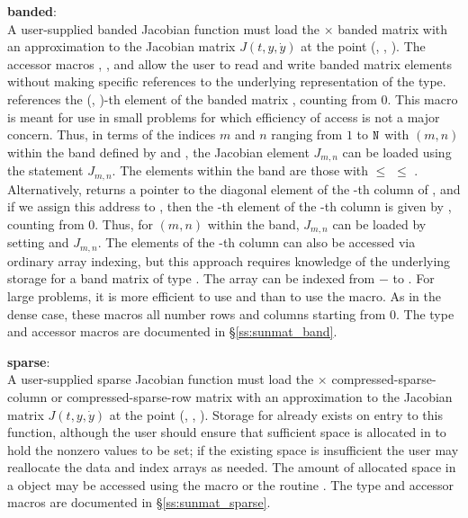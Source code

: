 {{  {\bf banded}:\\
  A user-supplied banded Jacobian function must load the  $\times$ 
  banded matrix  with an approximation to the Jacobian matrix $J(t,y,\dot{y})$
  at the point (, , ).
  The accessor macros ,
  , and  allow the user
  to read and write banded matrix elements without making specific
  references to the underlying representation of the {\sunmatband}
  type.   references the (,
  )-th element of the banded matrix , counting from $0$.
  This macro is meant for use in small problems for which efficiency
  of access is not a major concern.  Thus, in terms of the indices $m$
  and $n$ ranging from $1$ to ${\tt N}$ with $(m,n)$ within the band defined
  by  and , the Jacobian element $J_{m,n}$ can
  be loaded using the statement 
  $J_{m,n}$. The elements within the band are those with 
  $\le$  $\le$ . Alternatively,
   returns a pointer to the diagonal element
  of the -th column of , and if we assign this address
  to , then the -th element of the
  -th column is given by
  , counting from $0$.  Thus,
  for $(m,n)$ within the band, $J_{m,n}$ can be loaded by setting
   and
   $J_{m,n}$.  The
  elements of the -th column can also be accessed via ordinary
  array indexing, but this approach requires knowledge of the
  underlying storage for a band matrix of type {\sunmatband}.
  The array  can be indexed from $-$ to
  . For large problems, it is more efficient to use
   and  than to use the
   macro.  As in the dense case, these macros all
  number rows and columns starting from $0$.  The {\sunmatband} type
  and accessor macros are documented in \S\ref{ss:sunmat_band}.

  {\bf sparse}:\\
  A user-supplied sparse Jacobian function must load the  $\times$ 
  compressed-sparse-column or compressed-sparse-row matrix 
  with an approximation to the Jacobian matrix $J(t,y,\dot{y})$
  at the point (, , ).
  Storage for  already exists on entry to
  this function, although the user should ensure that sufficient space
  is allocated in  to hold the nonzero values to be set; if
  the existing space is insufficient the user may reallocate the data
  and index arrays as needed.  The amount of allocated space in a
  {\sunmatsparse} object may be accessed using the macro
   or the routine .  The
  {\sunmatsparse} type and accessor macros are documented in
  \S\ref{ss:sunmat_sparse}.

}}
